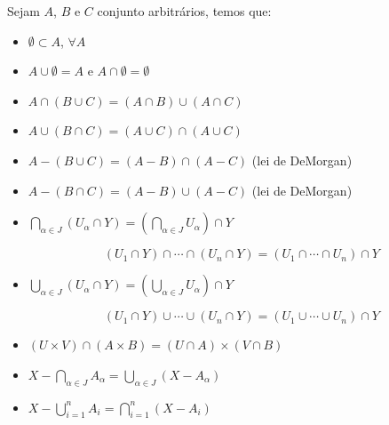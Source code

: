 \begin{prop}
Sejam $A$, $B$ e $C$ conjunto arbitrários, temos que:
\begin{itemize}
 \item $\emptyset \subset A$, $\forall A$
 \item $A \cup \emptyset= A$ e $A \cap \emptyset= \emptyset$
 \item $A \cap (B \cup C) = (A \cap B) \cup (A \cap C)$
 \item $A \cup (B \cap C) = (A \cup C) \cap (A \cup C)$
 \item $A - (B \cup C) = (A - B) \cap (A - C)$ (lei de DeMorgan)
 \item $A - (B \cap C) = (A - B) \cup (A - C)$ (lei de DeMorgan)
 \item $\bigcap_{\alpha \in J}(U_{\alpha} \cap Y) = (\bigcap_{\alpha \in J} U_{\alpha}) \cap Y$

  $$(U_1 \cap Y) \cap \cdots \cap (U_n \cap Y) = (U_1 \cap \cdots \cap U_n) \cap Y$$

 \item $\bigcup_{\alpha \in J}(U_{\alpha} \cap Y) = (\bigcup_{\alpha \in J} U_{\alpha}) \cap Y$

 $$(U_1 \cap Y) \cup \cdots \cup (U_n \cap Y) = (U_1 \cup \cdots \cup U_n) \cap Y$$

 \item $(U \times V) \cap (A \times B) = (U \cap A) \times (V \cap B)$

 \item $X - \bigcap_{\alpha \in J} A_{\alpha} = \bigcup_{\alpha \in J}(X - A_{\alpha})$

 \item $X - \bigcup_{i= 1}^{n} A_i = \bigcap_{i = 1}^{n}(X - A_i)$

\end{itemize}
\end{prop}






